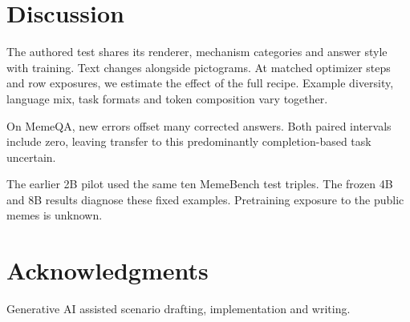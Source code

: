 \documentclass[11pt]{article}
\begin{document}
\section{Discussion}

The authored test shares its renderer, mechanism categories and answer style with training. Text changes alongside pictograms. At matched optimizer steps and row exposures, we estimate the effect of the full recipe. Example diversity, language mix, task formats and token composition vary together.

On MemeQA, new errors offset many corrected answers. Both paired intervals include zero, leaving transfer to this predominantly completion-based task uncertain.

The earlier 2B pilot used the same ten MemeBench test triples. The frozen 4B and 8B results diagnose these fixed examples. Pretraining exposure to the public memes is unknown.

\section*{Acknowledgments}
Generative AI assisted scenario drafting, implementation and writing.


\end{document}
